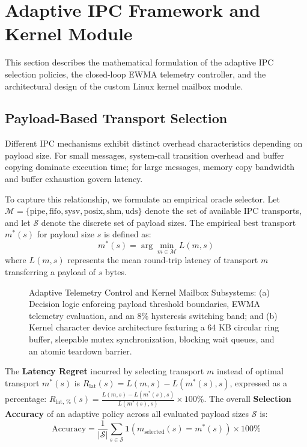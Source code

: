 \section{Adaptive IPC Framework and Kernel Module}
\label{sec:adaptive_kernel}

This section describes the mathematical formulation of the adaptive IPC selection policies, the closed-loop EWMA telemetry controller, and the architectural design of the custom Linux kernel mailbox module.

\subsection{Payload-Based Transport Selection}
Different IPC mechanisms exhibit distinct overhead characteristics depending on payload size. For small messages, system-call transition overhead and buffer copying dominate execution time; for large messages, memory copy bandwidth and buffer exhaustion govern latency.

To capture this relationship, we formulate an empirical oracle selector. Let $\mathcal{M} = \{\text{pipe}, \text{fifo}, \text{sysv}, \text{posix}, \text{shm}, \text{uds}\}$ denote the set of available IPC transports, and let $\mathcal{S}$ denote the discrete set of payload sizes. The empirical best transport $m^*(s)$ for payload size $s$ is defined as:
\begin{equation}
m^*(s) = \arg\min_{m \in \mathcal{M}} L(m, s)
\end{equation}
where $L(m, s)$ represents the mean round-trip latency of transport $m$ transferring a payload of $s$ bytes.

\begin{figure}[!t]
\centering
{}
\hfil
{}
\caption{Adaptive Telemetry Control and Kernel Mailbox Subsystems: (a) Decision logic enforcing payload threshold boundaries, EWMA telemetry evaluation, and an 8\% hysteresis switching band; and (b) Kernel character device architecture featuring a 64 KB circular ring buffer, sleepable mutex synchronization, blocking wait queues, and an atomic teardown barrier.}
\label{fig:adaptive_and_kernel}
\end{figure}

The \textbf{Latency Regret} incurred by selecting transport $m$ instead of optimal transport $m^*(s)$ is $R_{\text{lat}}(s) = L(m, s) - L(m^*(s), s)$, expressed as a percentage: $R_{\text{lat, \%}}(s) = \frac{L(m, s) - L(m^*(s), s)}{L(m^*(s), s)} \times 100\%$.
The overall \textbf{Selection Accuracy} of an adaptive policy across all evaluated payload sizes $\mathcal{S}$ is:
\begin{equation}
\text{Accuracy} = \frac{1}{|\mathcal{S}|} \sum_{s \in \mathcal{S}} \mathbf{1}\left(m_{\text{selected}}(s) = m^*(s)\right) \times 100\%
\end{equation}

